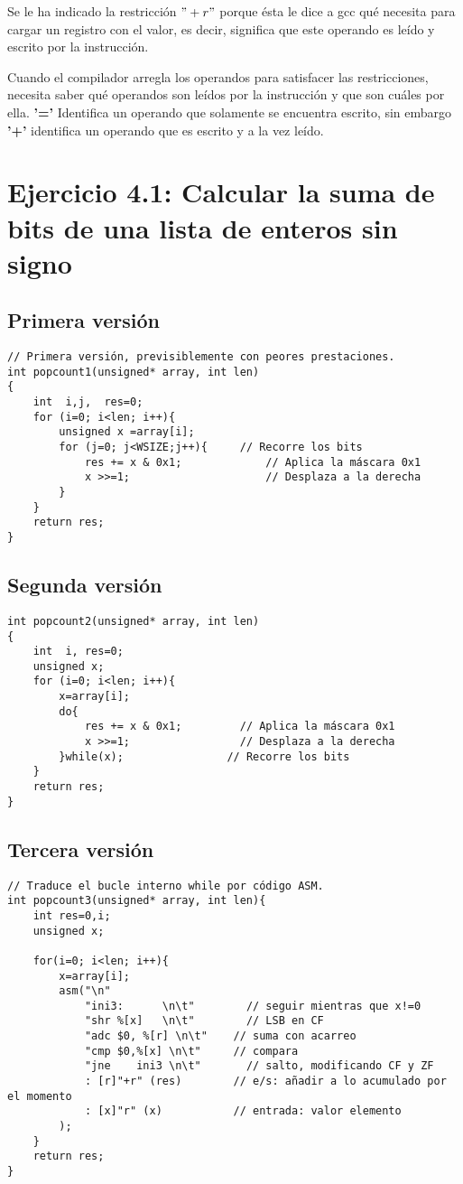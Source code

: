 Se le ha indicado la restricción $ "+r" $ porque ésta le dice a gcc qué necesita para cargar un registro con el valor, es decir, significa que este operando es leído y escrito por la instrucción.

Cuando el compilador arregla los operandos para satisfacer las restricciones, necesita saber qué operandos son leídos por la instrucción y que son cuáles por ella. \textbf{'='} Identifica un operando que solamente se encuentra escrito, sin embargo \textbf{'+'} identifica un operando que es escrito y a la vez leído.

\newpage

\section{Ejercicio 4.1: Calcular la suma de bits de una lista de enteros sin signo}
\subsection{Primera versión}
\begin{lstlisting}
// Primera versión, previsiblemente con peores prestaciones.
int popcount1(unsigned* array, int len)
{
	int  i,j,  res=0;
	for (i=0; i<len; i++){
		unsigned x =array[i];
		for (j=0; j<WSIZE;j++){     // Recorre los bits
			res += x & 0x1;         	// Aplica la máscara 0x1
			x >>=1;                 	// Desplaza a la derecha
		}
	}
	return res;
}
\end{lstlisting}

\subsection{Segunda versión}
\begin{lstlisting}
int popcount2(unsigned* array, int len)
{
	int  i, res=0;
	unsigned x;
	for (i=0; i<len; i++){
		x=array[i];
		do{
			res += x & 0x1;         // Aplica la máscara 0x1
			x >>=1;                 // Desplaza a la derecha
		}while(x);                // Recorre los bits
	}
	return res;
}
\end{lstlisting}

\newpage

\subsection{Tercera versión}
\begin{lstlisting}
// Traduce el bucle interno while por código ASM.
int popcount3(unsigned* array, int len){
	int res=0,i;
	unsigned x;
	
	for(i=0; i<len; i++){
		x=array[i];
		asm("\n"
			"ini3:		\n\t"        // seguir mientras que x!=0
			"shr %[x]	\n\t"        // LSB en CF
			"adc $0, %[r] \n\t"    // suma con acarreo
			"cmp $0,%[x] \n\t"     // compara
			"jne	ini3 \n\t"       // salto, modificando CF y ZF
			: [r]"+r" (res)        // e/s: añadir a lo acumulado por el momento
			: [x]"r" (x)           // entrada: valor elemento
		);
	}
	return res;
}
\end{lstlisting}

